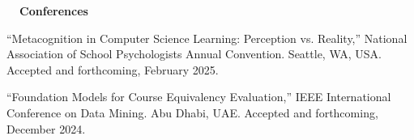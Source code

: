 \documentclass[hidelinks, 10pt]{article}
\begin{document}
{\vspace{4mm}

\vspace{7mm}


{\fontsize{14}{14}\selectfont \textbf{\ \ Conferences\ \ }}\hrulefill

\vspace{5mm}

\begin{minipage}[ct]{0.9\linewidth}
    ``Metacognition in Computer Science Learning: Perception vs. Reality,'' National Association of School Psychologists Annual Convention.
    Seattle, WA, USA. Accepted and forthcoming, February 2025.
\end{minipage}

\vspace{4mm}

\begin{minipage}[ct]{0.9\linewidth}
    ``Foundation Models for Course Equivalency Evaluation,'' IEEE International Conference on Data Mining.  Abu Dhabi, UAE.  Accepted and
    forthcoming, December 2024.
\end{minipage}

\vspace{4mm}









}
\end{document}
